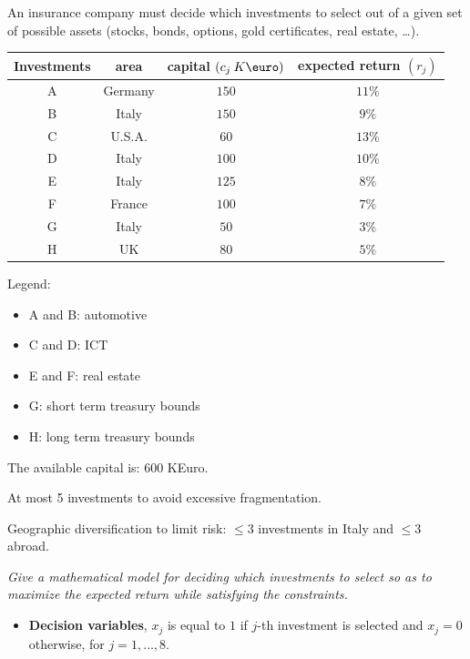 \begin{examplebox}
    An insurance company must decide which investments to select out of a given set of possible assets (stocks, bonds, options, gold certificates, real estate, \dots).

    \begin{center}
        \begin{tabular}{@{} c | c c c @{}}
            Investments & area & capital $\left(c_{j} \: K\text{\euro}\right)$ & expected return $\left(r_{j}\right)$ \\
            \midrule
            A & Germany & $150$ & $11\%$ \\
            B & Italy & $150$ & $9\%$ \\
            C & U.S.A. & $60$ & $13\%$ \\
            D & Italy & $100$ & $10\%$ \\
            E & Italy & $125$ & $8\%$ \\
            F & France & $100$ & $7\%$ \\
            G & Italy & $50$ & $3\%$ \\
            H & UK & $80$ & $5\%$
        \end{tabular}
    \end{center}
    Legend:
    \begin{itemize}
        \item A and B: automotive
        \item C and D: ICT
        \item E and F: real estate
        \item G: short term treasury bounds
        \item H: long term treasury bounds
    \end{itemize}
    The available capital is: $600$ KEuro.

    At most 5 investments to avoid excessive fragmentation.

    Geographic diversification to limit risk: $\le 3$ investments in Italy and $\le 3$ abroad.

    \emph{Give a mathematical model for deciding which investments to select so as to maximize the expected return while satisfying the constraints.}

    \begin{itemize}
        \item \textbf{Decision variables}, $x_{j}$ is equal to $1$ if $j$-th investment is selected and $x_{j}=0$ otherwise, for $j = 1, \dots, 8$.
        

\end{itemize}
\end{examplebox}
